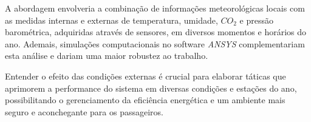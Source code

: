 \documentclass[acronym,symbols,table]{fei}
\begin{document}
\begin{itemize}[label=\arabic*.]
A abordagem envolveria a combinação de informações meteorológicas locais com as medidas internas e externas de temperatura, umidade, ${CO}_{2}$ e pressão barométrica, adquiridas através de sensores, em diversos momentos e horários do ano. Ademais, simulações computacionais no software \textit{ANSYS} complementariam esta análise e dariam uma maior robustez ao trabalho.

Entender o efeito das condições externas é crucial para elaborar táticas que aprimorem a performance do sistema em diversas condições e estações do ano, possibilitando o gerenciamento da eficiência energética e um ambiente mais seguro e aconchegante para os passageiros.

\end{itemize}

\printbibliography
\end{document}
